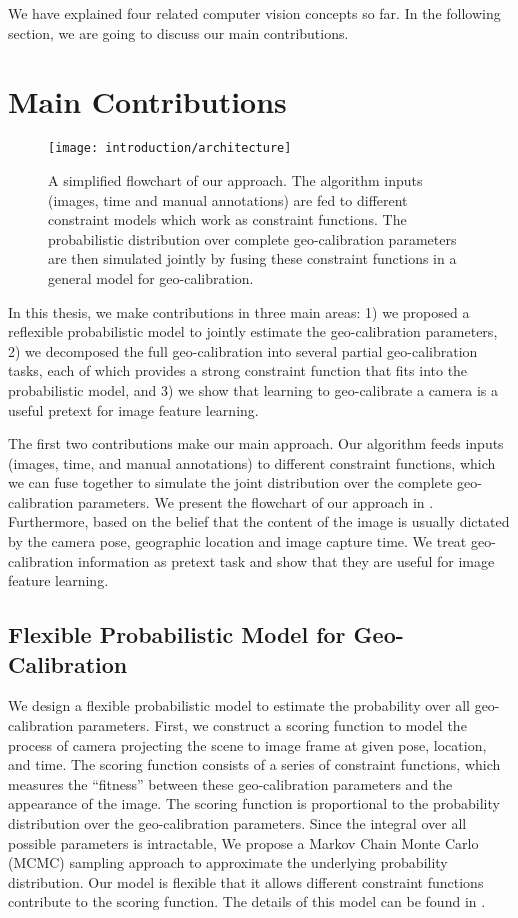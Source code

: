 We have explained four related computer vision concepts so far. In the
following section, we are going to discuss our main contributions.

\section{Main Contributions}

\begin{figure}
  \centering
  \texttt{[image: introduction/architecture]}
  \caption{A simplified flowchart of our approach. The algorithm
inputs (images, time and manual annotations) are fed to different
constraint models which work as constraint functions. 
The probabilistic distribution over complete geo-calibration
parameters are then simulated jointly by fusing these constraint
functions in a general model for geo-calibration.}
  \label{fig:intro:architecture}
\end{figure}

In this thesis, we make contributions in three main areas: 1) we
proposed a reflexible probabilistic model to jointly estimate the
geo-calibration parameters, 2) we decomposed the full geo-calibration
into several partial geo-calibration tasks, each of which provides a
strong constraint function that fits into the probabilistic model,
and 3) we show that learning to geo-calibrate a camera is a useful
pretext for image feature learning.
 
The first two contributions make our main approach. Our
algorithm feeds inputs (images, time, and manual annotations) to
different constraint functions, which we can fuse together to simulate
the joint distribution over the complete geo-calibration parameters.
We present the flowchart of our approach in
.
%
Furthermore, based on the belief that the content of the image is usually dictated
by the camera pose, geographic location and image capture time. We
treat geo-calibration information as pretext task and show that they
are useful for image feature learning.


\subsection{Flexible Probabilistic Model for Geo-Calibration}
We design a flexible probabilistic model to estimate the probability
over all geo-calibration parameters.
First, we construct a scoring function to model the process of camera
projecting the scene to image frame at given pose, location, and time.
%
The scoring function consists of a series of constraint functions,
which measures the ``fitness'' between these geo-calibration
parameters and the appearance of the image. 
%
The scoring function is proportional to the probability distribution
over the geo-calibration parameters. Since the integral over all
possible parameters is intractable, We propose a Markov Chain Monte
Carlo (MCMC) sampling approach to approximate the underlying
probability distribution. 
%
Our model is flexible that it allows different constraint functions
contribute to the scoring function. The details of this model can be
found in .

